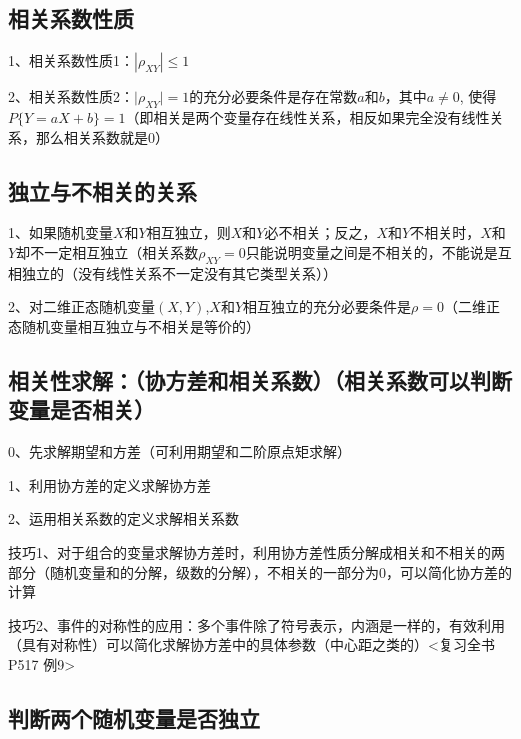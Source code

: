 \subsection{相关系数性质}

1、相关系数性质1：$\left|\rho_{X Y}\right| \leqslant 1$

2、相关系数性质2：$\mid \rho_{X Y} \mid=1$的充分必要条件是存在常数$a$和$b$，其中$a \neq 0$, 使得$P\{Y=a X+b\}=1$（即相关是两个变量存在线性关系，相反如果完全没有线性关系，那么相关系数就是0）



\subsection{独立与不相关的关系}

1、如果随机变量$X$和$Y$相互独立，则$X$和$Y$必不相关；反之，$X$和$Y$不相关时，$X$和$Y$却不一定相互独立（相关系数$\rho_{X Y}=0$只能说明变量之间是不相关的，不能说是互相独立的（没有线性关系不一定没有其它类型关系））

2、对二维正态随机变量$(X,Y)$,$X$和$Y$相互独立的充分必要条件是$\rho=0$（二维正态随机变量相互独立与不相关是等价的）



\subsection{相关性求解：（协方差和相关系数）（相关系数可以判断变量是否相关）}

0、先求解期望和方差（可利用期望和二阶原点矩求解）

1、利用协方差的定义求解协方差

2、运用相关系数的定义求解相关系数

技巧1、对于组合的变量求解协方差时，利用协方差性质分解成相关和不相关的两部分（随机变量和的分解，级数的分解），不相关的一部分为0，可以简化协方差的计算

技巧2、事件的对称性的应用：多个事件除了符号表示，内涵是一样的，有效利用（具有对称性）可以简化求解协方差中的具体参数（中心距之类的）<复习全书P517 例9>



\subsection{判断两个随机变量是否独立}

